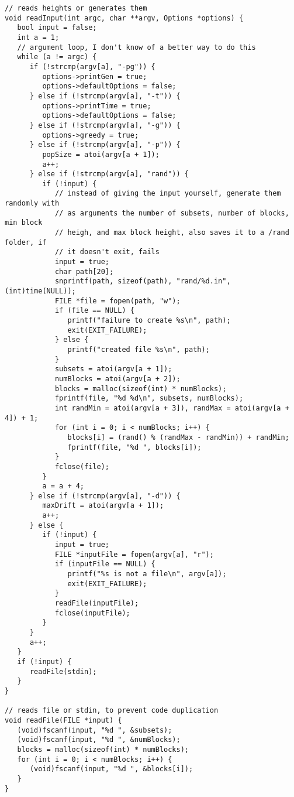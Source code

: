 \documentclass[a4paper,10pt]{article}
\begin{document}
\begin{lstlisting}[style = code, title = parprob.c]
// reads heights or generates them
void readInput(int argc, char **argv, Options *options) {
   bool input = false;
   int a = 1;
   // argument loop, I don't know of a better way to do this
   while (a != argc) {
      if (!strcmp(argv[a], "-pg")) {
         options->printGen = true;
         options->defaultOptions = false;
      } else if (!strcmp(argv[a], "-t")) {
         options->printTime = true;
         options->defaultOptions = false;
      } else if (!strcmp(argv[a], "-g")) {
         options->greedy = true;
      } else if (!strcmp(argv[a], "-p")) {
         popSize = atoi(argv[a + 1]);
         a++;
      } else if (!strcmp(argv[a], "rand")) {
         if (!input) {
            // instead of giving the input yourself, generate them randomly with
            // as arguments the number of subsets, number of blocks, min block
            // heigh, and max block height, also saves it to a /rand folder, if
            // it doesn't exit, fails
            input = true;
            char path[20];
            snprintf(path, sizeof(path), "rand/%d.in", (int)time(NULL));
            FILE *file = fopen(path, "w");
            if (file == NULL) {
               printf("failure to create %s\n", path);
               exit(EXIT_FAILURE);
            } else {
               printf("created file %s\n", path);
            }
            subsets = atoi(argv[a + 1]);
            numBlocks = atoi(argv[a + 2]);
            blocks = malloc(sizeof(int) * numBlocks);
            fprintf(file, "%d %d\n", subsets, numBlocks);
            int randMin = atoi(argv[a + 3]), randMax = atoi(argv[a + 4]) + 1;
            for (int i = 0; i < numBlocks; i++) {
               blocks[i] = (rand() % (randMax - randMin)) + randMin;
               fprintf(file, "%d ", blocks[i]);
            }
            fclose(file);
         }
         a = a + 4;
      } else if (!strcmp(argv[a], "-d")) {
         maxDrift = atoi(argv[a + 1]);
         a++;
      } else {
         if (!input) {
            input = true;
            FILE *inputFile = fopen(argv[a], "r");
            if (inputFile == NULL) {
               printf("%s is not a file\n", argv[a]);
               exit(EXIT_FAILURE);
            }
            readFile(inputFile);
            fclose(inputFile);
         }
      }
      a++;
   }
   if (!input) {
      readFile(stdin);
   }
}

// reads file or stdin, to prevent code duplication
void readFile(FILE *input) {
   (void)fscanf(input, "%d ", &subsets);
   (void)fscanf(input, "%d ", &numBlocks);
   blocks = malloc(sizeof(int) * numBlocks);
   for (int i = 0; i < numBlocks; i++) {
      (void)fscanf(input, "%d ", &blocks[i]);
   }
}


\end{lstlisting}
\end{document}
